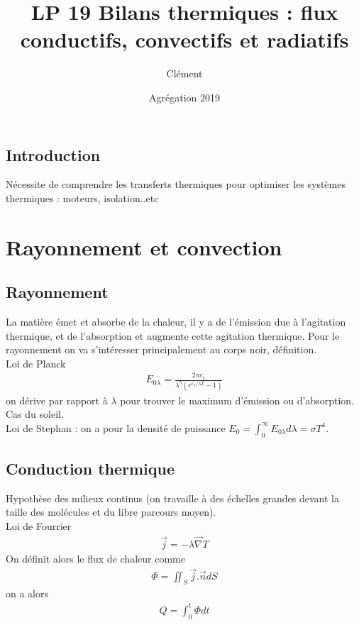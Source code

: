 \documentclass[12pt,prb,aps,epsf]{article}
\begin{document}
	
	\title{LP 19 Bilans thermiques : flux conductifs, convectifs et radiatifs}
	\author{Clément}
	\date{Agrégation 2019}
	
	\maketitle
	
	\tableofcontents
	
	\pagebreak
	
\subsection{Introduction}
Nécessite de comprendre les transferts thermiques pour optimiser les systèmes thermiques : moteurs, isolation..etc

\section{Rayonnement et convection}
\subsection{Rayonnement}
La matière émet et absorbe de la chaleur, il y a de l'émission due à l'agitation thermique, et de l'absorption et augmente cette agitation thermique. Pour le rayonnement on va s'intéresser principalement au corps noir, définition.\\
Loi de Planck
\begin{eqnarray}
E_{0\lambda} = \frac{2\pi c_1}{\lambda^5(e^{c_2/\lambda T}-1)}
\end{eqnarray}
on dérive par rapport à $\lambda$ pour trouver le maximum d'émission ou d'absorption. Cas du soleil.\\

Loi de Stephan : on a pour la densité de puissance $E_0 = \int_0^{\infty}E_{0\lambda}d\lambda = \sigma T^4$.

\subsection{Conduction thermique}
Hypothèse des milieux continus (on travaille à des échelles grandes devant la taille des molécules et du libre parcours moyen). \\
Loi de Fourrier 
\begin{eqnarray}
\vec{j} = -\lambda \vec{\nabla}T
\end{eqnarray}
On définit alors le flux de chaleur comme
\begin{eqnarray}
\Phi = \iint _S \vec{j}.\vec{n}dS
\end{eqnarray}
on a alors 
\begin{eqnarray}
Q = \int_0^t \Phi dt
\end{eqnarray}
\end{document}
